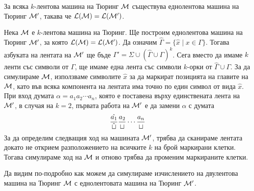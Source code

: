 \begin{prop}
  За всяка $k$-лентова машина на Тюринг $\mathcal{M}$ съществува еднолентова машина на Тюринг $\mathcal{M}'$,
  такава че $\mathcal{L}(\mathcal{M}) = \mathcal{L}(\mathcal{M}')$.
\end{prop}
\begin{hint}
  Нека $\mathcal{M}$ е $k$-лентова машина на Тюринг.
  Ще построим еднолентова машина на Тюринг $\mathcal{M}'$, за която $\mathcal{L}(\mathcal{M}) = \mathcal{L}(\mathcal{M}')$.
  Да означим $\hat\Gamma = \{\hat x \mid x \in \Gamma\}$.
  Тогава азбуката на лентата на $\mathcal{M}'$ ще бъде $\Gamma' = \Sigma \cup (\hat\Gamma \cup \Gamma)^{k}$.
  Сега вместо да имаме $k$ ленти със символи от $\Gamma$, ще имаме една лента със символи $k$-орки от $\hat\Gamma \cup \Gamma$.
  За да симулираме $\mathcal{M}$, използваме символите $\hat x$ за да маркират позицията на главите на $\mathcal{M}$,
  като във всяка компонента на лентата има точно по един символ от вида $\hat x$.
  При вход думата $\alpha = a_1a_2\cdots a_n$, която е поставена върху единствената лента на $\mathcal{M}'$, в случая на $k = 2$,
  първата работа на $\mathcal{M}'$ е да замени $\alpha$ с думата
  \[\frac{\hat{a_1}}{\hat{\sqcup}}\frac{a_2}{\sqcup}\cdots\frac{a_n}{\sqcup}\]
  За да определим следващия ход на машината $\mathcal{M}'$, трябва да сканираме лентата докато не 
  открием разположението на всичките $k$ на брой маркирани клетки. Тогава симулираме ход на $\mathcal{M}$
  и отново трябва да променим маркираните клетки.
\end{hint}

Да видим по-подробно как можем да симулираме изчислението на двулентова машина на Тюринг $\mathcal{M}$ с еднолентовата машина на Тюринг $\mathcal{M}'$.

